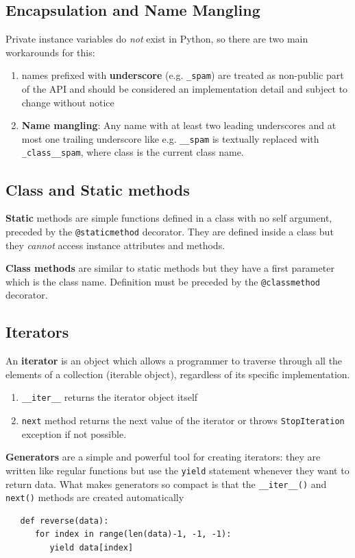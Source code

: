 \subsection{Encapsulation and Name Mangling}
Private instance variables do \textit{not} exist in Python,
so there are two main workarounds for this:
\begin{enumerate}
   \item names prefixed with \textbf{underscore} (e.g. \lstinline|_spam|) are treated as
   non-public part of the API and should be considered an implementation detail and subject to change without notice
   \item \textbf{Name mangling}:
   Any name with at least two leading underscores and at most one trailing
   underscore like e.g. \lstinline|__spam| is textually replaced with \lstinline|_class__spam|,
   where class is the current class name.
\end{enumerate}

\subsection{Class and Static methods}
\textbf{Static} methods are simple functions defined in a class with no self
argument, preceded by the \lstinline|@staticmethod| decorator.
They are defined inside a class but they \textit{cannot} access instance attributes and methods.

\textbf{Class methods} are similar to static methods but they have a first parameter which is the class name.
Definition must be preceded by the \lstinline|@classmethod| decorator.

\subsection{Iterators}
An \textbf{iterator} is an object which allows a programmer to traverse through all the
elements of a collection (iterable object), regardless of its specific implementation.
\begin{enumerate}
   \item \lstinline|__iter__| returns the iterator object itself
   \item \lstinline|next| method returns the next value of the iterator or throws \lstinline|StopIteration| exception if not possible.
\end{enumerate}

\textbf{Generators} are a simple and powerful tool for creating iterators:
they are written like regular functions but use the \lstinline|yield| statement whenever they want to return data.
What makes generators so compact is that the \lstinline|__iter__()| and
\lstinline|next()| methods are created automatically
\begin{lstlisting}
   def reverse(data):
      for index in range(len(data)-1, -1, -1):
         yield data[index]
\end{lstlisting}

